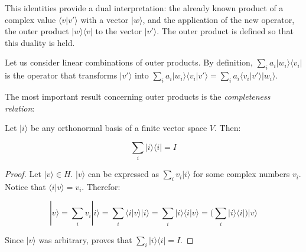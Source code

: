 This identities provide a dual interpretation: the already known product of a complex value $\langle v|v'\rangle$ with a vector $|w\rangle$, and the application of the new operator, the outer product $|w\rangle\langle v|$ to the vector $|v'\rangle$. The outer product is defined so that this duality is held.

Let us consider linear combinations of outer products. By definition, $\sum_i a_i |w_i\rangle\langle v_i|$ is the operator that transforms $|v'\rangle$ into $\sum_i a_i |w_i\rangle\langle v_i|v'\rangle = \sum_i a_i \langle v_i|v'\rangle |w_i\rangle$.

The most important result concerning outer products is the \emph{completeness relation}:

\begin{proposition}
	Let $|i\rangle$ be any orthonormal basis of a finite vector space $V$. Then:
	
	$$ \sum_i |i\rangle\langle i| = I $$
\end{proposition}

\begin{proof}
	Let $|v\rangle \in H$. $|v\rangle$ can be expressed as $ \sum_i v_i |i\rangle$ for some complex numbers $v_i$. Notice that $\langle i|v\rangle = v_i$. Therefor:
	
	$$|v\rangle = \sum_i v_i |i\rangle = \sum_i \langle i|v\rangle |i\rangle = \sum_i |i\rangle\langle i|v\rangle = \bigg( \sum_i |i\rangle\langle i|\bigg) |v\rangle$$
	
	Since $|v\rangle$ was arbitrary, proves that $ \sum_i |i\rangle\langle i | = I $.
\end{proof}

